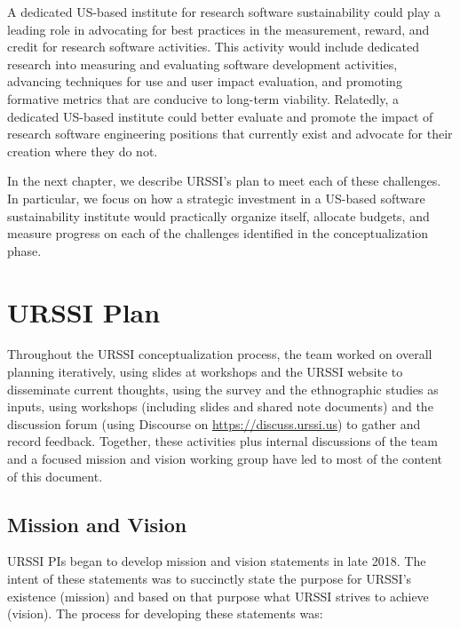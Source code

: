 \documentclass[
]{book}
\begin{document}
A dedicated US-based institute for research software sustainability could
play a leading role in advocating for best practices in the measurement,
reward, and credit for research software activities. This activity would include
dedicated research into measuring and evaluating software development activities,
advancing techniques for use and user impact evaluation, and promoting formative
metrics that are conducive to long-term viability. Relatedly, a dedicated US-based
institute could better evaluate and promote the impact of research software
engineering positions that currently exist and advocate for their creation
where they do not.

In the next chapter, we describe URSSI's plan to meet each of these challenges.
In particular, we focus on how a strategic investment in a US-based software
sustainability institute would practically organize itself, allocate budgets,
and measure progress on each of the challenges identified in the conceptualization phase.

\hypertarget{chapter3}{%
\chapter{URSSI Plan}\label{chapter3}}

Throughout the URSSI conceptualization process, the team worked on overall
planning iteratively, using slides at workshops and the URSSI website to
disseminate current thoughts, using the survey and the ethnographic studies as
inputs, using workshops (including slides and shared note documents) and the
discussion forum (using Discourse on \url{https://discuss.urssi.us}) to gather and record feedback. Together,
these activities plus internal discussions of the team and a focused mission and
vision working group have led to most of the content of this document.

\hypertarget{mission-and-vision}{%
\section{Mission and Vision}\label{mission-and-vision}}

URSSI PIs began to develop mission and vision statements in late 2018. The intent
of these statements was to succinctly state the purpose for URSSI's existence
(mission) and based on that purpose what URSSI strives to achieve (vision). The
process for developing these statements was:
\end{document}
